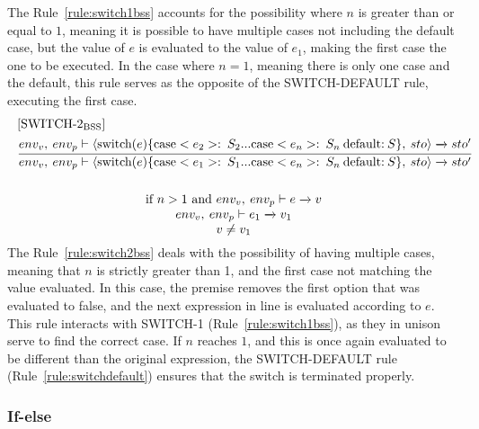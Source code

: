 The Rule~\ref{rule:switch1bss} accounts for the possibility where $n$ is greater than or equal to $1$, meaning it is possible to have multiple cases not including the default case, but the value of $e$ is evaluated to the value of $e_1$, making the first case the one to be executed. In the case where $ n = 1$, meaning there is only one case and the default, this rule serves as the opposite of the SWITCH-DEFAULT rule, executing the first case.
\begin{equation}\label{rule:switch2bss}
\begin{split}
\begin{minipage}{\linewidth}
$[\text{SWITCH-2}_\text{BSS}]$
\end{minipage}
\\
\begin{minipage}{\linewidth}
\centering
$\cfrac
{
    env_v, \: env_p \vdash \langle  \text{switch}(e) \{\text{case} <e_2>: \: S_2 ... \text{case} <e_n>: \: S_n \: \text{default:} \: S\}, \: sto \rangle \xrightarrow{} sto'
}
{
    env_v, \: env_p \vdash \langle \text{switch}(e) \{\text{case} <e_1>: \: S_1 ... \text{case} <e_n>: \: S_n \: \text{default:} \: S\}, \: sto \rangle \xrightarrow{} sto' 
}$ 
\end{minipage}
\\\\
\begin{minipage}{\linewidth}
\centering
if $ n > 1$ and $env_v, \: env_p \vdash e \xrightarrow{} v$
\\
$env_v, \: env_p \vdash e_1 \xrightarrow{} v_1$
\\
$v \neq v_1$
\end{minipage}
\end{split}
\end{equation}
The Rule~\ref{rule:switch2bss} deals with the possibility of having multiple cases, meaning that $n$ is strictly greater than 1, and the first case not matching the value evaluated. In this case, the premise removes the first option that was evaluated to false, and the next expression in line is evaluated according to $e$. This rule interacts with SWITCH-1 (Rule~\ref{rule:switch1bss}), as they in unison serve to find the correct case. If $n$ reaches $1$, and this is once again evaluated to be different than the original expression, the SWITCH-DEFAULT rule (Rule~\ref{rule:switchdefault}) ensures that the switch is terminated properly.

\subsubsection{If-else}

